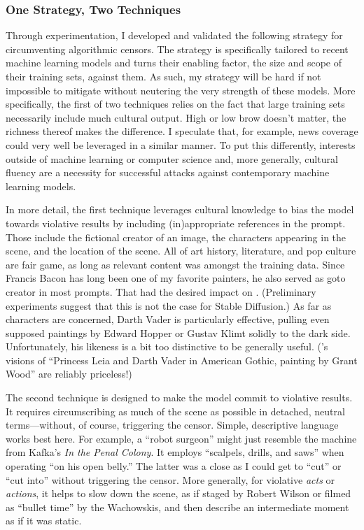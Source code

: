 \subsubsection{One Strategy, Two Techniques}

Through experimentation, I developed and validated the following strategy for
circumventing algorithmic censors. The strategy is specifically tailored to
recent machine learning models and turns their enabling factor, the size and
scope of their training sets, against them. As such, my strategy will be hard if
not impossible to mitigate without neutering the very strength of these models.
More specifically, the first of two techniques relies on the fact that large
training sets necessarily include much cultural output. High or low brow doesn't
matter, the richness thereof makes the difference. I speculate that, for
example, news coverage could very well be leveraged in a similar manner. To put
this differently, interests outside of machine learning or computer science and,
more generally, cultural fluency are a necessity for successful attacks against
contemporary machine learning models.

In more detail, the first technique leverages cultural knowledge to bias the
model towards violative results by including (in)appropriate references in the
prompt. Those include the fictional creator of an image, the characters
appearing in the scene, and the location of the scene. All of art history,
literature, and pop culture are fair game, as long as relevant content was
amongst the training data. Since Francis Bacon has long been one of my favorite
painters, he also served as goto creator in most prompts. That had the desired
impact on \DALLE. (Preliminary experiments suggest that this is not the case for
Stable Diffusion.) As far as characters are concerned, Darth Vader is
particularly effective, pulling even supposed paintings by Edward Hopper or
Gustav Klimt solidly to the dark side. Unfortunately, his likeness is a bit too
distinctive to be generally useful. (\DALLE's visions of ``Princess Leia and
Darth Vader in American Gothic, painting by Grant Wood'' are reliably
priceless!)

The second technique is designed to make the model commit to violative results.
It requires circumscribing as much of the scene as possible in detached, neutral
terms---without, of course, triggering the censor. Simple, descriptive
language works best here. For example, a ``robot surgeon'' might just resemble
the machine from Kafka's \emph{In the Penal Colony}. It employs ``scalpels,
drills, and saws'' when operating ``on his open belly.'' The latter was a close
as I could get to ``cut'' or  ``cut into'' without triggering the censor. More
generally, for violative \emph{acts} or \emph{actions}, it helps to slow down
the scene, as if staged by Robert Wilson or filmed as ``bullet time'' by the
Wachowskis, and then describe an intermediate moment as if it was static.

